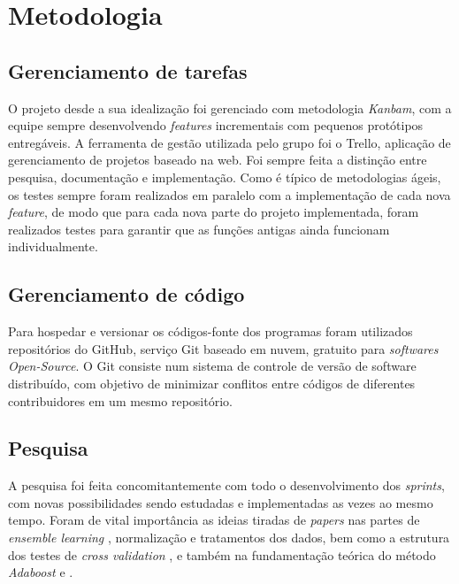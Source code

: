 \chapter{Metodologia}

\section{Gerenciamento de tarefas}
O projeto desde a sua idealização foi gerenciado com metodologia \textit{Kanbam}, com a equipe sempre desenvolvendo \textit{features} incrementais com pequenos protótipos entregáveis. A ferramenta de gestão utilizada pelo grupo foi o Trello, aplicação de gerenciamento de projetos baseado na web. Foi sempre feita a distinção entre pesquisa, documentação e implementação. Como é típico de metodologias ágeis, os testes sempre foram realizados em paralelo com a implementação de cada nova \textit{feature}, de modo que para cada nova parte do projeto implementada, foram realizados testes para garantir que as funções antigas ainda funcionam individualmente.
\section{Gerenciamento de código}
Para hospedar e versionar os códigos-fonte dos programas foram utilizados repositórios do GitHub, serviço Git baseado em nuvem, gratuito para \textit{softwares Open-Source}. O Git consiste num sistema de controle de versão de software distribuído, com objetivo de minimizar conflitos entre códigos de diferentes contribuidores em um mesmo repositório.

\section{Pesquisa} 
A pesquisa foi feita concomitantemente com todo o desenvolvimento dos \textit{sprints}, com novas possibilidades sendo estudadas e implementadas as vezes ao mesmo tempo. Foram de vital importância as ideias tiradas de \textit{papers} nas partes de \textit{ensemble learning} \cite{comparativeEN}, normalização e tratamentos dos dados, bem como a estrutura dos testes de \textit{cross validation} \cite{comparative}, e também na fundamentação teórica do método \textit{Adaboost} \cite{explainingadaboost} e \cite{adaboost}.
